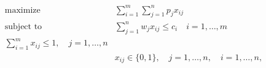 \begin{align*}
\text{maximize} \quad & \sum_{i=1}^m \sum_{j=1}^n p_j x_{ij} \\
\text{subject to} \quad & \sum_{j=1}^n w_j x_{ij} \leq c_i \quad i = 1, \ldots, m \\
\sum_{i=1}^m x_{ij} \leq 1, \quad j = 1, \ldots, n \\
& x_{ij} \in \lbrace 0, 1 \rbrace, \quad j = 1, \ldots,n, \quad i = 1, \ldots, n,
\end{align*}


